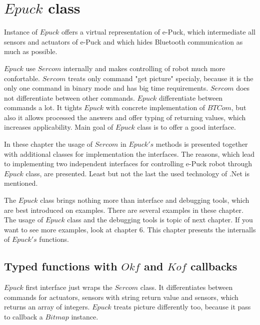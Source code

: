 \section{$Epuck$ class} \label{sec:epuck}
	Instance of $Epuck$ offers a virtual representation of e-Puck,
	which intermediate all sensors and actuators of e-Puck and which hides Bluetooth communication
	as much as possible.

	$Epuck$ use $Sercom$ internally and makes controlling of robot much more confortable.
	$Sercom$ treats only command "get picture" specialy, because it is the only one command in binary mode
	and has big time requirements. $Sercom$ does not differentiate between other commands.
	$Epuck$ differentiate between commands a lot. It tights $Epuck$ with concrete implementation of $BTCom$,
	but also it allows processed the answers and offer typing of returning values, which increases
	applicability. Main goal of $Epuck$ class is to offer a good interface.

	In these chapter the usage of $Sercom$ in $Epuck's$ methods is presented together with additional classes
	for implementation the interfaces. The reasons, which lead to implementing two independent interfaces for
	controlling e-Puck robot through $Epuck$ class, are presented.
	Least but not the last the used technology of .Net is mentioned.

	The $Epuck$ class brings nothing more than interface and debugging tools, which are best introduced
	on examples. There are several examples in these chapter. The usage of $Epuck$ class and the debugging
	tools is topic of next chapter. If you want to see more examples, look at chapter 6.
	This chapter presents the internalls of $Epuck's$ functions.
	
\subsection{Typed functions with $Okf$ and $Kof$ callbacks} \label{sec:okfkofi}
	$Epuck$ first interface just wraps the $Sercom$ class. It differentiates between
	commands for actuators, sensors with string return value and sensors, which returns an array of integers.
	$Epuck$ treats picture differently too, because it pass to callback a $Bitmap$ instance.


